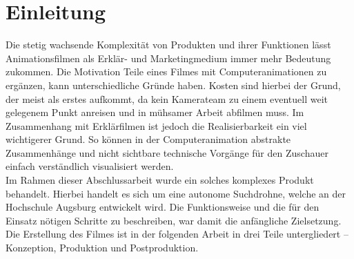 \chapter{Einleitung}

Die stetig wachsende Komplexität von Produkten und ihrer Funktionen lässt Animationsfilmen als Erklär- und Marketingmedium immer mehr Bedeutung zukommen. Die Motivation Teile eines Filmes mit Computeranimationen zu ergänzen, kann unterschiedliche Gründe haben. Kosten sind hierbei der Grund, der meist als erstes aufkommt, da kein Kamerateam zu einem eventuell weit gelegenem Punkt anreisen und in mühsamer Arbeit abfilmen muss. Im Zusammenhang mit Erklärfilmen ist jedoch die Realisierbarkeit ein viel wichtigerer Grund. So können in der Computeranimation abstrakte Zusammenhänge und nicht sichtbare technische Vorgänge für den Zuschauer einfach verständlich visualisiert werden.\\
Im Rahmen dieser Abschlussarbeit wurde ein solches komplexes Produkt behandelt. Hierbei handelt es sich um eine autonome Suchdrohne, welche an der Hochschule Augsburg entwickelt wird. Die Funktionsweise und die für den Einsatz nötigen Schritte zu beschreiben, war damit die anfängliche Zielsetzung.
Die Erstellung des Filmes ist in der folgenden Arbeit in drei Teile untergliedert -- Konzeption, Produktion und Postproduktion.